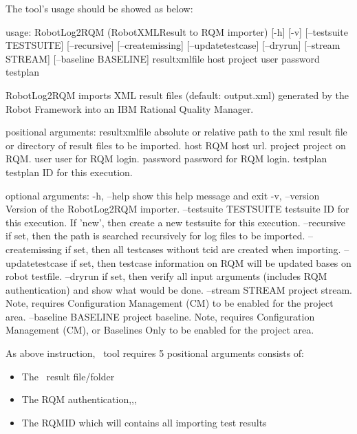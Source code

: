 The tool's usage should be showed as below:
\begin{robotlog}
usage: RobotLog2RQM (RobotXMLResult to RQM importer) [-h] [-v] [--testsuite TESTSUITE] [--recursive] [--createmissing] [--updatetestcase] [--dryrun] [--stream STREAM] [--baseline BASELINE]
                                                     resultxmlfile host project user password testplan

RobotLog2RQM imports XML result files (default: output.xml) generated by the Robot Framework into an IBM Rational Quality Manager.

positional arguments:
  resultxmlfile         absolute or relative path to the xml result file or directory of result files to be imported.
  host                  RQM host url.
  project               project on RQM.
  user                  user for RQM login.
  password              password for RQM login.
  testplan              testplan ID for this execution.

optional arguments:
  -h, --help            show this help message and exit
  -v, --version         Version of the RobotLog2RQM importer.
  --testsuite TESTSUITE
  testsuite ID for this execution. If 'new', then create a new testsuite for this execution.
  --recursive           if set, then the path is searched recursively for log files to be imported.
  --createmissing       if set, then all testcases without tcid are created when importing.
  --updatetestcase      if set, then testcase information on RQM will be updated bases on robot testfile.
  --dryrun              if set, then verify all input arguments (includes RQM authentication) and show what would be done.
  --stream STREAM       project stream. Note, requires Configuration Management (CM) to be enabled for the project area.
  --baseline BASELINE   project baseline. Note, requires Configuration Management (CM), or Baselines Only to be enabled for the project area.
\end{robotlog}

As above instruction, \pkg\ tool requires 5 positional arguments consists of:
\begin{itemize}
  \item The \rfwcore\ result file/folder
  \item The RQM authentication,,,
  \item The RQMID which will contains all importing test results
\end{itemize}


